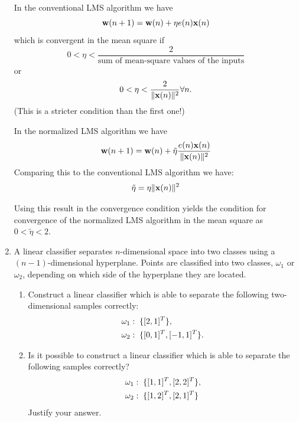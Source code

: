 \begin{enumerate}
\begin{solution}
    In the conventional LMS algorithm we have
    \begin{equation*}
      {\bf{w}}(n+1)={\bf{w}}(n)+\eta e(n){\bf{x}}(n)
    \end{equation*}
    which is convergent in the mean
    square if 
    \begin{equation*}
      0<\eta<\frac{2}{\mbox{sum of mean-square values of the
          inputs}}\end{equation*}
    or 
    \begin{equation*}
      0<\eta<\frac{2}{\|{\bf{x}}(n)\|^2} \forall n.
    \end{equation*}
    (This is a stricter condition than the first one!)



    In the normalized LMS algorithm we have
    \begin{equation*}
      {\bf{w}}(n+1)={\bf{w}}(n)+\tilde{\eta}\frac{e(n){\bf{x}}(n)}{\|{\bf{x}}(n)\|^2}
    \end{equation*}
    Comparing this to the conventional LMS algorithm we have:
    \begin{equation*}
      \tilde{\eta}=\eta\|{\bf{x}}(n)\|^2
    \end{equation*}

    Using this result in the convergence condition yields the condition
    for convergence of the normalized LMS algorithm in the mean square as
    $0<\tilde{\eta}<2$.

  \end{solution}
  

\item A linear classifier separates $n$-dimensional
  space into two classes using a $(n-1)$-dimensional hyperplane. Points
  are classified into two classes, $\omega_1$ or $\omega_2$, depending on
  which side of the hyperplane they are located.
  \begin{enumerate}
  \item Construct a linear classifier which is able to separate the
    following two-dimensional samples correctly:
    \begin{align}
      &\omega_1: \text{\;} \{[2,1]^T\}, \notag \\
      &\omega_2: \text{\;} \{[0,1]^T, [-1,1]^T \}. \notag
    \end{align}
  \item Is it possible to construct a linear classifier which is able
    to separate the following samples correctly?
    \begin{align}
      &\omega_1:\text{\;} \{ [1,1]^T, [2,2]^T \}, \notag \\
      &\omega_2: \text{\;} \{ [1,2]^T,[2,1]^T \} \notag
    \end{align}
    Justify your answer.
  \end{enumerate}


\end{enumerate}
